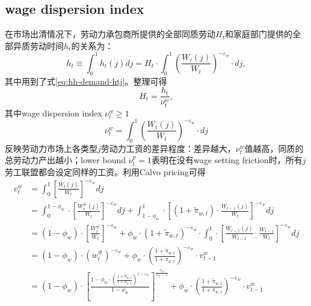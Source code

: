 \subsection{wage dispersion index}
\label{sec:wage-dispersion-index}
在市场出清情况下，劳动力承包商所提供的全部同质劳动$H_t$和家庭部门提供的全部异质劳动时间$h_t$的关系为：
\begin{equation*}
  h_t \equiv \int_{0}^{1}h_t(j) dj = H_t \cdot \int_{0}^{1} \left(\frac{W_t(j)}{W_t} \right)^{-\varepsilon_w} \cdot dj,
\end{equation*}
其中用到了式\eqref{eq:hh-demand-htj}。整理可得
\begin{equation}
  \label{eq:H-h-relationship-wage-dispersion}
  H_t = \frac{h_t}{\nu_t^w},
\end{equation}
其中wage dispersion index $\nu_t^w \ge 1$
\begin{equation}
  \label{eq:wage-dispersion-index}
  \nu_t^w = \int_{0}^{1} \left(\frac{W_t(j)}{W_t} \right)^{-\varepsilon_w} \cdot dj
\end{equation}
反映劳动力市场上各类型$j$劳动力工资的差异程度：差异越大，$\nu^w_t$值越高，同质的总劳动力产出越小；lower bound $\nu_t^p = 1$表明在没有wage setting friction时，所有$j$劳工联盟都会设定同样的工资。利用Calvo pricing可得
\begin{align}
  \label{eq:wage-dispersion-index-calvo}
  v_t^w &= \int_{0}^1 \left[\frac{W_t(j)}{W_t}\right]^{-\varepsilon_w} dj \nonumber \\
  &= \int_{0}^{1-\phi_w} \cdot \left[\frac{W_t^{\#}(j)}{W_t}\right]^{-\varepsilon_w} dj + \int_{1-\phi_w}^{1} \cdot \left[(1+\tilde{\pi}_{w,t}) \cdot \frac{W_{t-1}(j)}{W_t}\right]^{-\varepsilon_w} dj\nonumber \\
  &=(1-\phi_w) \cdot  \left[\frac{W_t^{\#}}{W_t}\right]^{-\varepsilon_w} + \phi_w \cdot \left(1+\tilde{\pi}_{w,t}\right)^{-\varepsilon_w} \cdot \int_{0}^{1} \cdot \left[ \frac{W_{t-1}(j)}{W_{t-1}} \cdot \frac{W_{t-1}}{W_t}\right]^{-\varepsilon_w} dj \nonumber \\
&=(1-\phi_w) \cdot (w_t^{\#})^{-\varepsilon_w} + \phi_w \cdot \left(\frac{1+\tilde{\pi}_{w,t}}{1+\pi_{w,t}}\right)^{-\varepsilon_w} \cdot v_{t-1}^{w} \nonumber \\
&=(1-\phi_w) \cdot \left[\frac{
      1-\phi_w \cdot \left(\frac{
          1+\tilde{\pi}_{w,t}
        }{
          1+\pi_{w,t}
        }\right)^{1-\varepsilon_w}
    }{
      1-\phi_w
    }\right]^{\frac{\varepsilon_w}{\varepsilon_w -1}} + \phi_w \cdot \left(\frac{1+\tilde{\pi}_{w,t}}{1+\pi_{w,t}}\right)^{-\varepsilon_w} \cdot v_{t-1}^{w}
\end{align}

